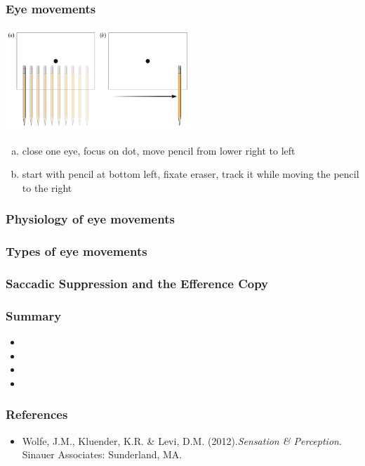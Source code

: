 \documentclass[]{beamer}
\begin{document}
\begin{frame}
 \frametitle{Eye movements}
\begin{overlayarea}{120mm}{80mm}
\begin{center}
\includegraphics[width=70mm]{figs/l7/eye_movement_demo.png} 
\end{center}
\begin{enumerate}[(a)]
 \item close one eye, focus on dot, move pencil from lower right to left
 \item start with pencil at bottom left, fixate eraser, track it while moving the pencil to the right
\end{enumerate}

\end{overlayarea}
\end{frame}


\begin{frame}
\frametitle{Physiology of eye movements}
\begin{overlayarea}{120mm}{80mm}
 
\end{overlayarea}
\end{frame}


\begin{frame}
\frametitle{Types of eye movements}
\begin{overlayarea}{120mm}{80mm}
 
\end{overlayarea}
\end{frame}



\begin{frame}
\frametitle{Saccadic Suppression and the Efference Copy}
\begin{overlayarea}{120mm}{80mm}
 
\end{overlayarea}
\end{frame}


\begin{frame}
 \frametitle{Summary}
\begin{itemize}
\setlength{\itemsep}{5pt}
 \item 
 \item 
 \item 
 \item 
\end{itemize}
\end{frame}



\begin{frame}
 \frametitle{References}
\begin{small}
\begin{itemize}
 \item  Wolfe, J.M., Kluender, K.R. \& Levi, D.M. (2012).\textit{Sensation \& Perception}. Sinauer Associates: Sunderland, MA. 
\end{itemize}
\end{small}
\end{frame}
\end{document}
